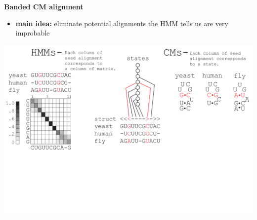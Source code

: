 \documentclass[landscape]{slides}
\begin{document}
\begin{slide}
\begin{center}
\large
\textbf{Banded CM alignment}
\end{center}
\medskip
\small
\begin{itemize}
\item
\textbf{main idea:} eliminate potential alignments the HMM tells us are very improbable
\end{itemize}
\begin{center}
\includegraphics[width=8in]{figs/post_hmm_to_cm_map2_layer8}
\end{center}
\vfill
\end{slide}
\end{document}
